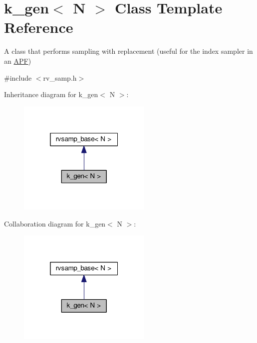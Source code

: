 \hypertarget{classk__gen}{}\section{k\+\_\+gen$<$ N $>$ Class Template Reference}
\label{classk__gen}


A class that performs sampling with replacement (useful for the index sampler in an \hyperlink{classAPF}{A\+PF})  




{\ttfamily \#include $<$rv\+\_\+samp.\+h$>$}



Inheritance diagram for k\+\_\+gen$<$ N $>$\+:\nopagebreak
\begin{figure}[H]
\begin{center}
\leavevmode
\includegraphics[width=181pt]{classk__gen__inherit__graph}
\end{center}
\end{figure}


Collaboration diagram for k\+\_\+gen$<$ N $>$\+:\nopagebreak
\begin{figure}[H]
\begin{center}
\leavevmode
\includegraphics[width=181pt]{classk__gen__coll__graph}
\end{center}
\end{figure}

